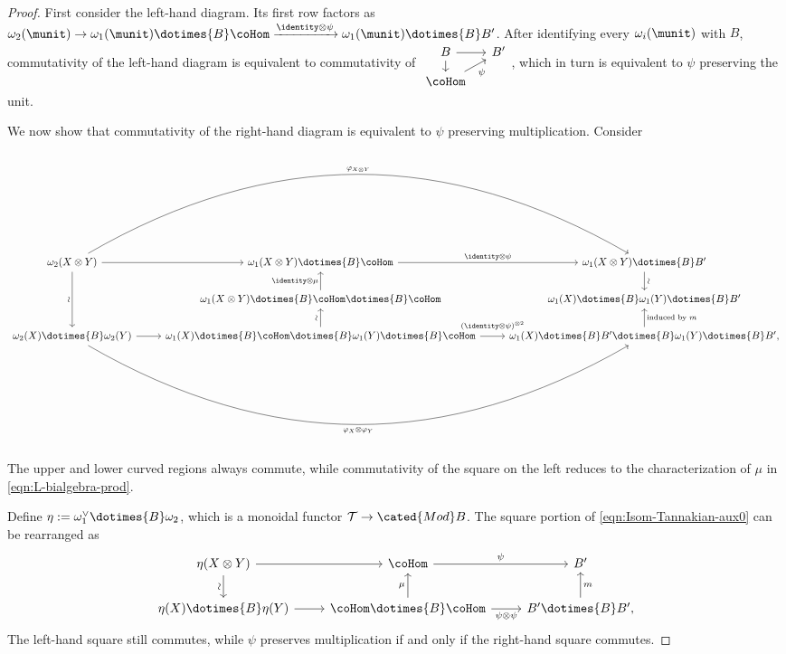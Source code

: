 \begin{proof}
	First consider the left-hand diagram. Its first row factors as
	$\omega_2(\munit)\to\omega_1(\munit)\dotimes{B}\coHom
	\xrightarrow{\identity\otimes\psi}\omega_1(\munit)\dotimes{B}B'$.
	After identifying every $\omega_i(\munit)$ with $B$, commutativity of the
	left-hand diagram is equivalent to commutativity of
	$\begin{tikzcd}[column sep=small, row sep=small]
		B \arrow[r] \arrow[d] & B' \\
		\coHom \arrow[ru, "\psi"'] &
	\end{tikzcd}$,
	which in turn is equivalent to $\psi$ preserving the unit.

	We now show that commutativity of the right-hand diagram is equivalent to
	$\psi$ preserving multiplication. Consider
	\begin{equation}\label{eqn:Isom-Tannakian-aux0}
		\begin{tikzcd}
			\omega_2(X \otimes Y) \arrow[rr, bend left, "{\varphi_{X \otimes Y}}"] \arrow[r] \arrow[dd, "\sim"' sloped] & \omega_1(X \otimes Y) \dotimes{B} \coHom \arrow[r, "{\identity \otimes \psi}"] & \omega_1(X \otimes Y) \dotimes{B} B' \arrow[d, "\sim" sloped] \\
			& \omega_1(X \otimes Y) \dotimes{B} \coHom \dotimes{B} \coHom \arrow[u, "{\identity \otimes \mu}"] & \omega_1(X) \dotimes{B} \omega_1(Y) \dotimes{B} B' \\
			\omega_2(X) \dotimes{B} \omega_2(Y) \arrow[rr, bend right, "{\varphi_X \otimes \varphi_Y}"'] \arrow[r] & \omega_1(X) \dotimes{B} \coHom \dotimes{B} \omega_1(Y) \dotimes{B} \coHom \arrow[r, "{(\identity \otimes \psi)^{\otimes 2}}" inner sep=0.6em] \arrow[u, "\sim" sloped] & \omega_1(X) \dotimes{B} B' \dotimes{B} \omega_1(Y) \dotimes{B} B' , \arrow[u, "{\text{induced by }m}"']
		\end{tikzcd}
	\end{equation}
	The upper and lower curved regions always commute, while commutativity of
	the square on the left reduces to the characterization of $\mu$ in
	\eqref{eqn:L-bialgebra-prod}.

	Define $\eta:=\omega_1^\vee\dotimes{B}\omega_2$, which is a monoidal
	functor $\mathcal{T}\to\cated{Mod}B$. The square portion of
	\eqref{eqn:Isom-Tannakian-aux0} can be rearranged as
	\begin{equation}\label{eqn:Isom-Tannakian-aux}
		\begin{tikzcd}
			\eta(X \otimes Y) \arrow[r] \arrow[d, "\sim"' sloped] & \coHom \arrow[r, "\psi"] & B' \\
			\eta(X) \dotimes{B} \eta(Y) \arrow[r] & \coHom \dotimes{B} \coHom \arrow[r, "{\psi \otimes \psi}"'] \arrow[u, "\mu"] & B' \dotimes{B} B' , \arrow[u, "m"']
		\end{tikzcd}
	\end{equation}
	The left-hand square still commutes, while $\psi$ preserves multiplication
	if and only if the right-hand square commutes.


\end{proof}
